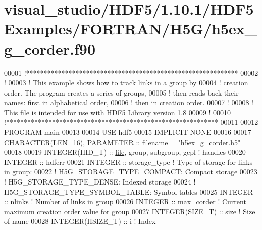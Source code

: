 \hypertarget{visual__studio_2_h_d_f5_21_810_81_2_h_d_f5_examples_2_f_o_r_t_r_a_n_2_h5_g_2h5ex__g__corder_8f90_source}{}\section{visual\+\_\+studio/\+H\+D\+F5/1.10.1/\+H\+D\+F5\+Examples/\+F\+O\+R\+T\+R\+A\+N/\+H5\+G/h5ex\+\_\+g\+\_\+corder.f90}
\label{visual__studio_2_h_d_f5_21_810_81_2_h_d_f5_examples_2_f_o_r_t_r_a_n_2_h5_g_2h5ex__g__corder_8f90_source}

\begin{DoxyCode}
00001 \textcolor{comment}{!************************************************************}
00002 \textcolor{comment}{!}
00003 \textcolor{comment}{!  This example shows how to track links in a group by}
00004 \textcolor{comment}{!  creation order.  The program creates a series of groups,}
00005 \textcolor{comment}{!  then reads back their names: first in alphabetical order,}
00006 \textcolor{comment}{!  then in creation order.}
00007 \textcolor{comment}{!}
00008 \textcolor{comment}{!  This file is intended for use with HDF5 Library version 1.8}
00009 \textcolor{comment}{!}
00010 \textcolor{comment}{!************************************************************}
00011 
00012 \textcolor{keyword}{PROGRAM} main
00013 
00014   \textcolor{keywordtype}{USE }hdf5
00015   \textcolor{keywordtype}{IMPLICIT NONE}
00016 
00017   \textcolor{keywordtype}{CHARACTER(LEN=16)}, \textcolor{keywordtype}{PARAMETER} :: filename   = \textcolor{stringliteral}{"h5ex\_g\_corder.h5"}
00018 
00019   \textcolor{keywordtype}{INTEGER(HID\_T)} :: \hyperlink{structfile}{file}, group, subgroup, gcpl \textcolor{comment}{! handles}
00020   \textcolor{keywordtype}{INTEGER} :: hdferr
00021   \textcolor{keywordtype}{INTEGER} :: storage\_type \textcolor{comment}{! Type of storage for links in group:}
00022                           \textcolor{comment}{!   H5G\_STORAGE\_TYPE\_COMPACT: Compact storage}
00023                           \textcolor{comment}{!   H5G\_STORAGE\_TYPE\_DENSE: Indexed storage}
00024                           \textcolor{comment}{!   H5G\_STORAGE\_TYPE\_SYMBOL\_TABLE: Symbol tables}
00025   \textcolor{keywordtype}{INTEGER} :: nlinks       \textcolor{comment}{! Number of links in group}
00026   \textcolor{keywordtype}{INTEGER} :: max\_corder   \textcolor{comment}{! Current maximum creation order value for group }
00027   \textcolor{keywordtype}{INTEGER(SIZE\_T)} :: size  \textcolor{comment}{! Size of name}
00028   \textcolor{keywordtype}{INTEGER(HSIZE\_T)} :: i     \textcolor{comment}{! Index}

\end{DoxyCode}

